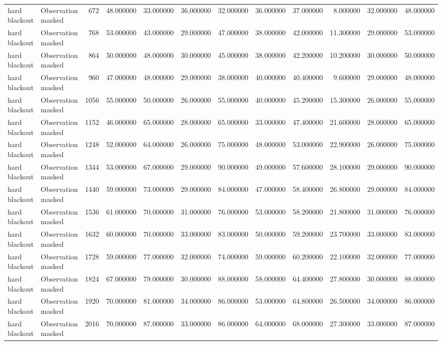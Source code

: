\begin{tabular}{llrrrrrrrrrr}
hard blackout & Observation masked & 672 & 48.000000 & 33.000000 & 36.000000 & 32.000000 & 36.000000 & 37.000000 & 8.000000 & 32.000000 & 48.000000 \\
hard blackout & Observation masked & 768 & 53.000000 & 43.000000 & 29.000000 & 47.000000 & 38.000000 & 42.000000 & 11.300000 & 29.000000 & 53.000000 \\
hard blackout & Observation masked & 864 & 50.000000 & 48.000000 & 30.000000 & 45.000000 & 38.000000 & 42.200000 & 10.200000 & 30.000000 & 50.000000 \\
hard blackout & Observation masked & 960 & 47.000000 & 48.000000 & 29.000000 & 38.000000 & 40.000000 & 40.400000 & 9.600000 & 29.000000 & 48.000000 \\
hard blackout & Observation masked & 1056 & 55.000000 & 50.000000 & 26.000000 & 55.000000 & 40.000000 & 45.200000 & 15.300000 & 26.000000 & 55.000000 \\
hard blackout & Observation masked & 1152 & 46.000000 & 65.000000 & 28.000000 & 65.000000 & 33.000000 & 47.400000 & 21.600000 & 28.000000 & 65.000000 \\
hard blackout & Observation masked & 1248 & 52.000000 & 64.000000 & 26.000000 & 75.000000 & 48.000000 & 53.000000 & 22.900000 & 26.000000 & 75.000000 \\
hard blackout & Observation masked & 1344 & 53.000000 & 67.000000 & 29.000000 & 90.000000 & 49.000000 & 57.600000 & 28.100000 & 29.000000 & 90.000000 \\
hard blackout & Observation masked & 1440 & 59.000000 & 73.000000 & 29.000000 & 84.000000 & 47.000000 & 58.400000 & 26.800000 & 29.000000 & 84.000000 \\
hard blackout & Observation masked & 1536 & 61.000000 & 70.000000 & 31.000000 & 76.000000 & 53.000000 & 58.200000 & 21.800000 & 31.000000 & 76.000000 \\
hard blackout & Observation masked & 1632 & 60.000000 & 70.000000 & 33.000000 & 83.000000 & 50.000000 & 59.200000 & 23.700000 & 33.000000 & 83.000000 \\
hard blackout & Observation masked & 1728 & 59.000000 & 77.000000 & 32.000000 & 74.000000 & 59.000000 & 60.200000 & 22.100000 & 32.000000 & 77.000000 \\
hard blackout & Observation masked & 1824 & 67.000000 & 79.000000 & 30.000000 & 88.000000 & 58.000000 & 64.400000 & 27.800000 & 30.000000 & 88.000000 \\
hard blackout & Observation masked & 1920 & 70.000000 & 81.000000 & 34.000000 & 86.000000 & 53.000000 & 64.800000 & 26.500000 & 34.000000 & 86.000000 \\
hard blackout & Observation masked & 2016 & 70.000000 & 87.000000 & 33.000000 & 86.000000 & 64.000000 & 68.000000 & 27.300000 & 33.000000 & 87.000000 \\
\bottomrule
\end{tabular}
